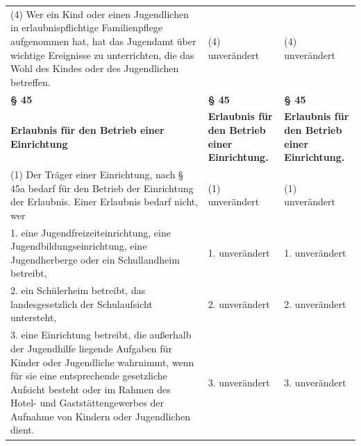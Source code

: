\documentclass[10pt,a4paper,landscape]{article}
\begin{document}
\begin{longtable}{|L{8.2cm}|L{8.2cm}|L{8.2cm}|}
\hhline{|---|}
(4) Wer ein Kind oder einen Jugendlichen  \newline in erlaubnispflichtige Familienpflege  \newline aufgenommen hat, hat das Jugendamt  \newline über wichtige Ereignisse zu unterrichten,  \newline die das Wohl des Kindes oder des  \newline Jugendlichen betreffen. & (4) unverändert & (4) unverändert \\
\hhline{|---|}
\textbf{\S{} 45} & \textbf{\S{} 45} & \textbf{\S{} 45} \\
\hhline{|---|}
\textbf{Erlaubnis für den Betrieb einer  \newline \textcolor{diffred}{Einrichtung}} & \textbf{Erlaubnis für den Betrieb einer  \newline Einrichtung.} & \textbf{Erlaubnis für den Betrieb einer  \newline Einrichtung.} \\
\hhline{|---|}
(1) Der Träger einer Einrichtung, nach \S{}  \newline 45a bedarf für den Betrieb der Einrichtung  \newline der Erlaubnis. Einer Erlaubnis bedarf nicht,  \newline wer & (1) unverändert & (1) unverändert \\
\hhline{|---|}
1.  \newline eine Jugendfreizeiteinrichtung, eine  \newline Jugendbildungseinrichtung, eine  \newline Jugendherberge oder ein Schullandheim  \newline betreibt, & 1. unverändert & 1. unverändert \\
\hhline{|---|}
2.  \newline ein Schülerheim betreibt, das  \newline landesgesetzlich der Schulaufsicht  \newline untersteht, & 2. unverändert & 2. unverändert \\
\hhline{|---|}
3.  \newline eine Einrichtung betreibt, die außerhalb der  \newline Jugendhilfe liegende Aufgaben für Kinder  \newline oder Jugendliche wahrnimmt, wenn für sie  \newline eine entsprechende gesetzliche Aufsicht  \newline besteht oder im Rahmen des Hotel- und  \newline Gaststättengewerbes der Aufnahme von  \newline Kindern oder Jugendlichen dient. & 3. unverändert & 3. unverändert \\

\end{longtable}
\end{document}
